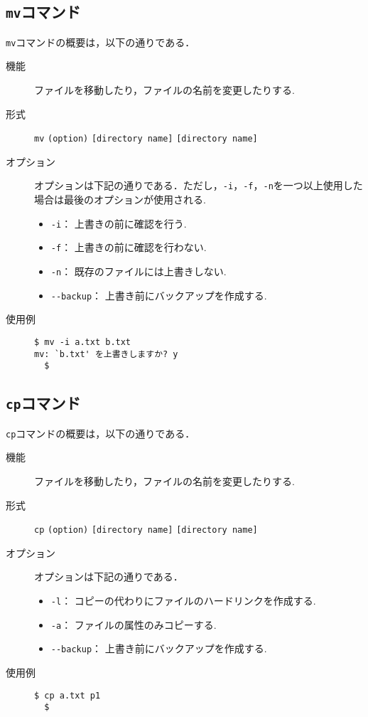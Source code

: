 \documentclass[a4j,11pt]{jarticle}
\begin{document}
\subsection{\texttt{mv}コマンド}
\verb|mv|コマンドの概要は，以下の通りである．
\begin{description}
  \item[機能] %
     ファイルを移動したり，ファイルの名前を変更したりする.
  \item[形式] %
    \verb|mv| \verb|(option)| \verb|[directory name]| \verb|[directory name]|
  \item[オプション] %
オプションは下記の通りである．ただし，\verb|-i|，\verb|-f|，\verb|-n|を一つ以上使用した場合は最後のオプションが使用される.
\begin{itemize}
      \item \verb|-i|：  上書きの前に確認を行う.
      \item \verb|-f|：  上書きの前に確認を行わない.
      \item \verb|-n|：  既存のファイルには上書きしない.
      \item \verb|--backup|：  上書き前にバックアップを作成する.
    \end{itemize}
  \item[使用例] %
    \begin{verbatim}
$ mv -i a.txt b.txt
mv: `b.txt' を上書きしますか? y
  $ 
    \end{verbatim}
\end{description}

\subsection{\texttt{cp}コマンド}
\verb|cp|コマンドの概要は，以下の通りである．
\begin{description}
  \item[機能] %
     ファイルを移動したり，ファイルの名前を変更したりする.
  \item[形式] %
    \verb|cp| \verb|(option)| \verb|[directory name]| \verb|[directory name]|
  \item[オプション] %
オプションは下記の通りである．
 \begin{itemize}
      \item \verb|-l|：  コピーの代わりにファイルのハードリンクを作成する.
      \item \verb|-a|：  ファイルの属性のみコピーする.
      \item \verb|--backup|：  上書き前にバックアップを作成する.
    \end{itemize}
  \item[使用例] %
    \begin{verbatim}
$ cp a.txt p1
  $
    \end{verbatim}
\end{description}
\end{document}
